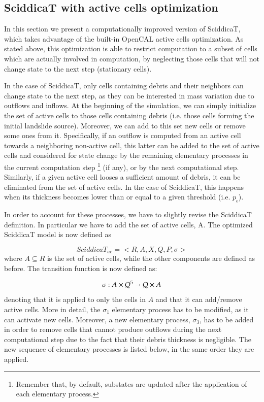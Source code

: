 \subsection{SciddicaT with active cells optimization}\label{sec:sciddicaT_active}
In this section we present a computationally improved version of
SciddicaT, which takes advantage of the built-in OpenCAL active cells
optimization. As stated above, this optimization is able to restrict
computation to a subset of cells which are actually involved in
computation, by neglecting those cells that will not change state to
the next step (stationary cells).

In the case of SciddicaT, only cells containing debris and their
neighbors can change state to the next step, as they can be
interested in mass variation due to outflows and inflows. At the
beginning of the simulation, we can simply initialize the set of
active cells to those cells containing debris (i.e. those cells
forming the initial landslide source). Moreover, we can add to this
set new cells or remove some ones from it. Specifically, if an outflow
is computed from an active cell towards a neighboring non-active
cell, this latter can be added to the set of active cells and
considered for state change by the remaining elementary processes in
the current computation step \footnote{Remember that, by default,
  substates are updated after the application of each elementary
  process.} (if any), or by the next computational step. Similarly, if
a given active cell looses a sufficient amount of debris, it can be
eliminated from the set of active cells. In the case of SciddicaT,
this happens when its thickness becomes lower than or equal to a given
threshold (i.e. $p_\epsilon$).

In order to account for these processes, we have to slightly revise
the SciddicaT definition. In particular we have to add the set of
active cells, A. The optimized SciddicaT model is now defined as

$$SciddicaT_{ac} = < R, A, X, Q , P, \sigma >$$
where $A \subseteq R$ is the set of active cells, while the other
components are defined as before. The transition function is now defined as:

$$\sigma : A \times Q^5 \shortrightarrow Q \times A$$ denoting that it
is applied to only the cells in $A$ and that it can add/remove active
cells. More in detail, the $\sigma_1$ elementary process has to be
modified, as it can activate new cells. Moreover, a new elementary
process, $\sigma_3$, has to be added in order to remove cells that
cannot produce outflows during the next computational step due to the
fact that their debris thickness is negligible. The new sequence of
elementary processes is listed below, in the same order they are
applied.


